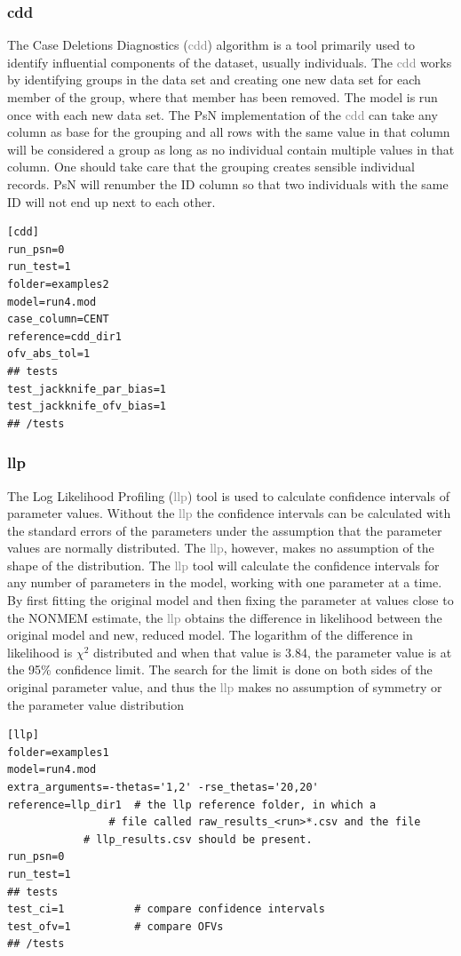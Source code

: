 \documentclass[a4,11pt]{report} \usepackage[pdftex]{graphicx}
\newcommand{\psn}[1]{\textcolor{Grey}{#1}}
\begin{document}
\subsubsection{cdd}
The Case Deletions Diagnostics (\psn{cdd}) algorithm is a tool
primarily used to identify influential components of the dataset,
usually individuals. The \psn{cdd} works by identifying groups in the
data set and creating one new data set for each member of the group,
where that member has been removed.  The model is run once with each
new data set. The PsN implementation of the \psn{cdd} can take any
column as base for the grouping and all rows with the same value in
that column will be considered a group as long as no individual
contain multiple values in that column. One should take care that the
grouping creates sensible individual records. PsN will renumber the ID
column so that two individuals with the same ID will not end up next
to each other.

\begin{lstlisting}
[cdd]
run_psn=0
run_test=1
folder=examples2
model=run4.mod
case_column=CENT
reference=cdd_dir1
ofv_abs_tol=1
## tests
test_jackknife_par_bias=1
test_jackknife_ofv_bias=1
## /tests
\end{lstlisting}

\subsubsection{llp}
The Log Likelihood Profiling (\psn{llp}) tool is used to calculate
confidence intervals of parameter values.  Without the \psn{llp} the
confidence intervals can be calculated with the standard errors of the
parameters under the assumption that the parameter values are normally
distributed. The \psn{llp}, however, makes no assumption of the shape
of the distribution.  The \psn{llp} tool will calculate the confidence
intervals for any number of parameters in the model, working with one
parameter at a time. By first fitting the original model and then
fixing the parameter at values close to the NONMEM estimate, the
\psn{llp} obtains the difference in likelihood between the original
model and new, reduced model. The logarithm of the difference in
likelihood is $\chi^2$ distributed and when that value is 3.84, the
parameter value is at the 95\% confidence limit. The search for the
limit is done on both sides of the original parameter value, and thus
the \psn{llp} makes no assumption of symmetry or the parameter value
distribution

\begin{lstlisting}
[llp]
folder=examples1
model=run4.mod
extra_arguments=-thetas='1,2' -rse_thetas='20,20'
reference=llp_dir1  # the llp reference folder, in which a
	            # file called raw_results_<run>*.csv and the file
		    # llp_results.csv should be present.
run_psn=0
run_test=1
## tests
test_ci=1           # compare confidence intervals
test_ofv=1          # compare OFVs
## /tests
\end{lstlisting}
\end{document}
